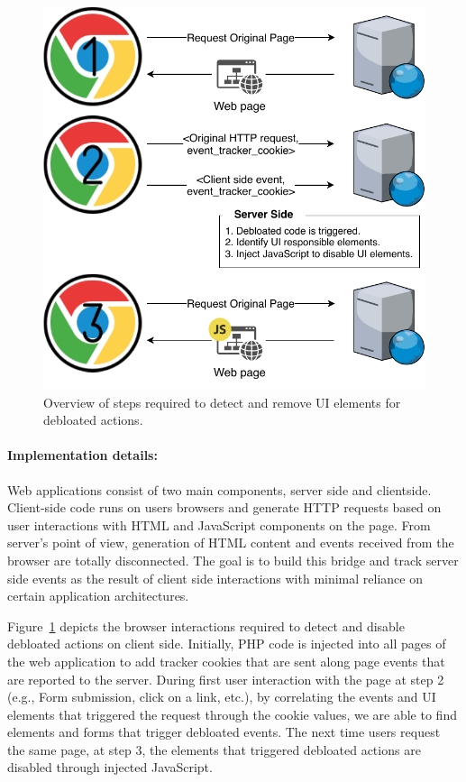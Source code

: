 \begin{figure}[t]
  \centering
  \includegraphics[width=0.7\linewidth]{figures/UI-backend-debloating.pdf}
  \caption{Overview of steps required to detect and remove UI elements for debloated actions.}
  \label{fig:uidebloating}
\end{figure}

\paragraph{Implementation details:} Web applications consist of two main components, server side and clientside. Client-side code runs on users browsers and generate HTTP requests based on user interactions with HTML and JavaScript components on the page. From server's point of view, generation of HTML content and events received from the browser are totally disconnected. The goal is to build this bridge and track server side events as the result of client side interactions with minimal reliance on certain application architectures.

Figure~\ref{fig:uidebloating} depicts the browser interactions required to detect and disable debloated actions on client side. Initially, PHP code is injected into all pages of the web application to add tracker cookies that are sent along page events that are reported to the server. During first user interaction with the page at step 2 (e.g., Form submission, click on a link, etc.), by correlating the events and UI elements that triggered the request through the cookie values, we are able to find elements and forms that trigger debloated events. The next time users request the same page, at step 3, the elements that triggered debloated actions are disabled through injected JavaScript.

